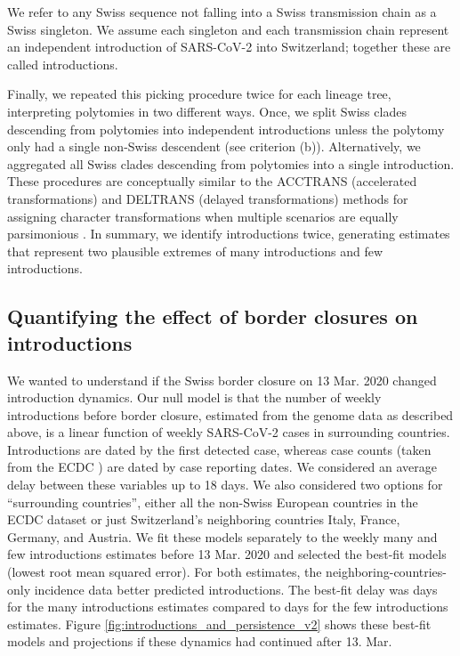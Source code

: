 \documentclass[9pt,twoside,lineno]{pnas-new}
\begin{document}
We refer to any Swiss sequence not falling into a Swiss transmission chain as a Swiss singleton. We assume each singleton and each transmission chain represent an independent introduction of SARS-CoV-2 into Switzerland; together these are called introductions.

Finally, we repeated this picking procedure twice for each lineage tree, interpreting polytomies in two different ways. Once, we split Swiss clades descending from polytomies into independent introductions unless the polytomy only had a single non-Swiss descendent (see criterion (b)). Alternatively, we aggregated all Swiss clades descending from polytomies into a single introduction. These procedures are conceptually similar to the ACCTRANS (accelerated transformations) and DELTRANS (delayed transformations) methods for assigning character transformations when multiple scenarios are equally parsimonious \cite{Miyakawa2004}. In summary, we identify introductions twice, generating estimates that represent two plausible extremes of  many introductions and few introductions.

\subsection{Quantifying the effect of border closures on introductions}
We wanted to understand if the Swiss border closure on 13 Mar. 2020 changed introduction dynamics. Our null model is that the number of weekly introductions before border closure, estimated from the genome data as described above, is a linear function of weekly SARS-CoV-2 cases in surrounding countries. Introductions are dated by the first detected case, whereas case counts (taken from the ECDC \cite{ECDC}) are dated by case reporting dates. We considered an average delay between these variables up to 18 days. We also considered two options for ``surrounding countries'', either all the non-Swiss European countries in the ECDC dataset or just Switzerland's neighboring countries Italy, France, Germany, and Austria. We fit these models separately to the weekly many and few introductions estimates before 13 Mar. 2020 and selected the best-fit models (lowest root mean squared error). For both estimates, the neighboring-countries-only incidence data better predicted introductions. The best-fit delay was \casesdelaymax days for the many introductions estimates compared to \casesdelaymin days for the few introductions estimates. Figure \ref{fig:introductions_and_persistence_v2} shows these best-fit models and projections if these dynamics had continued after 13. Mar.
\end{document}
